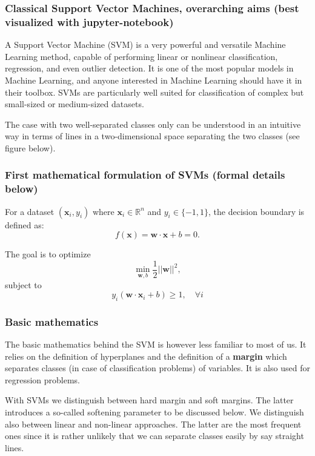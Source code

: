 \documentclass{beamer}
\begin{document}
\begin{frame}
\frametitle{Classical Support Vector Machines, overarching aims (best visualized with jupyter-notebook)}

A Support Vector Machine (SVM) is a very powerful and versatile
Machine Learning method, capable of performing linear or nonlinear
classification, regression, and even outlier detection. It is one of
the most popular models in Machine Learning, and anyone interested in
Machine Learning should have it in their toolbox. SVMs are
particularly well suited for classification of complex but small-sized or
medium-sized datasets.  

The case with two well-separated classes only can be understood in an
intuitive way in terms of lines in a two-dimensional space separating
the two classes (see figure below).
\end{frame}

\begin{frame}
\frametitle{First mathematical formulation of SVMs (formal details below)}

For a dataset \((\mathbf{x}_i, y_i)\) where \(\mathbf{x}_i \in
\mathbb{R}^n\) and \(y_i \in \{-1, 1\}\), the decision boundary is
defined as:
\[
f(\mathbf{x}) = \mathbf{w} \cdot \mathbf{x} + b = 0.
\]

The goal is to optimize
\[
\min_{\mathbf{w}, b} \frac{1}{2} ||\mathbf{w}||^2,
\]
subject to
\[
y_i (\mathbf{w} \cdot \mathbf{x}_i + b) \geq 1, \quad \forall i
\]
\end{frame}

\begin{frame}
\frametitle{Basic mathematics}

The basic mathematics behind the SVM is however less familiar to most of us. 
It relies on the definition of hyperplanes and the
definition of a \textbf{margin} which separates classes (in case of
classification problems) of variables. It is also used for regression
problems.

With SVMs we distinguish between hard margin and soft margins. The
latter introduces a so-called softening parameter to be discussed
below.  We distinguish also between linear and non-linear
approaches. The latter are the most frequent ones since it is rather
unlikely that we can separate classes easily by say straight lines.
\end{frame}
\end{document}
